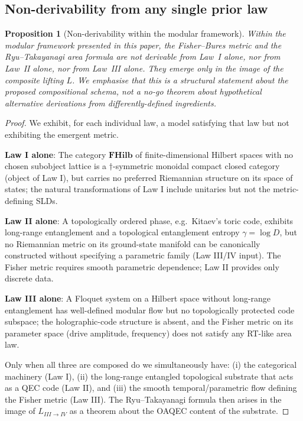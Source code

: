 \documentclass[12pt]{article}
\newtheorem{proposition}[theorem]{Proposition}
\theoremstyle{definition}
\theoremstyle{remark}
\newcommand{\FHilb}{\mathbf{FHilb}}
\begin{document}
\subsection{Non-derivability from any single prior law}

\begin{proposition}[Non-derivability within the modular framework]
\label{prop:nonderivability}
Within the modular framework presented in this paper, the Fisher--Bures metric and the Ryu--Takayanagi area formula are \emph{not} derivable from Law~I alone, nor from Law~II alone, nor from Law~III alone. They emerge only in the image of the composite lifting $L$. We emphasise that this is a structural statement about the proposed compositional schema, not a no-go theorem about hypothetical alternative derivations from differently-defined ingredients.
\end{proposition}

\begin{proof}
We exhibit, for each individual law, a model satisfying that law but not exhibiting the emergent metric.

\textbf{Law I alone}: The category $\FHilb$ of finite-dimensional Hilbert spaces with no chosen subobject lattice is a $\dagger$-symmetric monoidal compact closed category (object of Law I), but carries no preferred Riemannian structure on its space of states; the natural transformations of Law I include unitaries but not the metric-defining SLDs.

\textbf{Law II alone}: A topologically ordered phase, e.g.\ Kitaev's toric code, exhibits long-range entanglement and a topological entanglement entropy $\gamma = \log D$, but no Riemannian metric on its ground-state manifold can be canonically constructed without specifying a parametric family (Law III/IV input). The Fisher metric requires smooth parametric dependence; Law II provides only discrete data.

\textbf{Law III alone}: A Floquet system on a Hilbert space without long-range entanglement has well-defined modular flow but no topologically protected code subspace; the holographic-code structure is absent, and the Fisher metric on its parameter space (drive amplitude, frequency) does not satisfy any RT-like area law.

Only when all three are composed do we simultaneously have: (i) the categorical machinery (Law I), (ii) the long-range entangled topological substrate that acts as a QEC code (Law II), and (iii) the smooth temporal/parametric flow defining the Fisher metric (Law III). The Ryu--Takayanagi formula then arises in the image of $L_{III\to IV}$ as a theorem about the OAQEC content of the substrate.
\end{proof}
\end{document}
